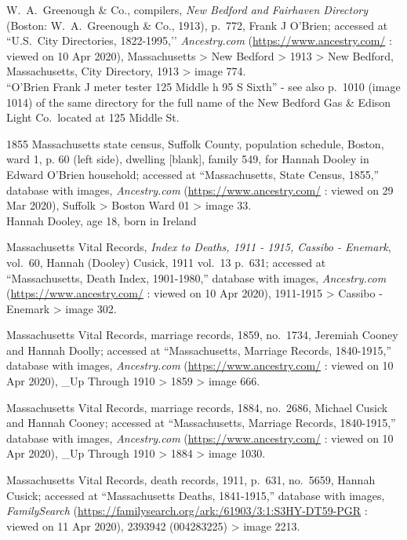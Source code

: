 \begin{thebibliography}{99}
	W.\ A.\ Greenough \& Co., compilers, \textit{New Bedford and Fairhaven Directory} (Boston: W.\ A.\ Greenough \& Co., 1913), p.\ 772, Frank J O'Brien; accessed at ``U.S.\ City Directories, 1822-1995,’’ \textit{Ancestry.com} (\url{https://www.ancestry.com/} : viewed on 10 Apr 2020), Massachusetts > New Bedford > 1913 > New Bedford, Massachusetts, City Directory, 1913 > image 774.\\
	``O'Brien Frank J meter tester 125 Middle h 95 S Sixth'' - see also p.\ 1010 (image 1014) of the same directory for the full name of the New Bedford Gas \& Edison Light Co.\ located at 125 Middle St.
	
	1855 Massachusetts state census, Suffolk County, population schedule, Boston, ward 1, p. 60 (left side), dwelling [blank], family 549, for Hannah Dooley in Edward O'Brien household; accessed at ``Massachusetts, State Census, 1855,'' database with images, \textit{Ancestry.com} (\url{https://www.ancestry.com/} : viewed on 29 Mar 2020), Suffolk > Boston Ward 01 > image 33.\\
	Hannah Dooley, age 18, born in Ireland
	
	Massachusetts Vital Records, \textit{Index to Deaths, 1911 - 1915, Cassibo - Enemark}, vol.\ 60, Hannah (Dooley) Cusick, 1911 vol.\ 13 p.\ 631; accessed at ``Massachusetts, Death Index, 1901-1980,'' database with images, \textit{Ancestry.com} (\url{https://www.ancestry.com/} : viewed on 10 Apr 2020), 1911-1915 > Cassibo - Enemark > image 302.
	
	Massachusetts Vital Records, marriage records, 1859, no.\ 1734, Jeremiah Cooney and Hannah Doolly; accessed at ``Massachusetts, Marriage Records, 1840-1915,'' database with images, \textit{Ancestry.com} (\url{https://www.ancestry.com/} : viewed on 10 Apr 2020), \_Up Through 1910 > 1859 > image 666.
	
	Massachusetts Vital Records, marriage records, 1884, no.\ 2686, Michael Cusick and Hannah Cooney; accessed at ``Massachusetts, Marriage Records, 1840-1915,'' database with images, \textit{Ancestry.com} (\url{https://www.ancestry.com/} : viewed on 10 Apr 2020), \_Up Through 1910 > 1884 > image 1030.
	
	Massachusetts Vital Records, death records, 1911, p.\ 631, no.\ 5659, Hannah Cusick; accessed at ``Massachusetts Deaths, 1841-1915,'' database with images, \textit{FamilySearch} (\url{https://familysearch.org/ark:/61903/3:1:S3HY-DT59-PGR} : viewed on 11 Apr 2020), 2393942 (004283225) > image 2213.
	

\end{thebibliography}
